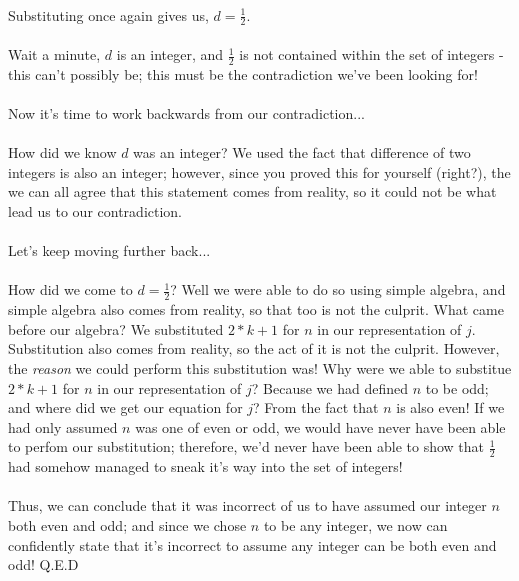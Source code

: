 \documentclass[a4paper,12pt]{article}
\begin{document}
\\ 
Substituting once again gives us, $d = \frac{1}{2}$.\\
\\
Wait a minute, $d$ is an integer, and $\frac{1}{2}$ is not contained within the set of integers - this can't possibly be; this must be the contradiction we've been looking for!\\
\\
Now it's time to work backwards from our contradiction...\\
\\
How did we know $d$ was an integer? We used the fact that difference of two integers is also an integer; however, since you proved this for yourself (right?), the we can all agree that this statement comes from reality, so it could not be what lead us to our contradiction.\\ 
\\
Let's keep moving further back...\\
\\
How did we come to $d = \frac{1}{2}$? Well we were able to do so using simple algebra, and simple algebra also comes from reality, so that too is not the culprit. What came before our algebra? We substituted $2*k + 1$ for $n$ in our representation of $j$. Substitution also comes from reality, so the act of it is not the culprit. However, the \textit{reason} we could perform this substitution was! Why were we able to substitue $2*k + 1$ for $n$ in our representation of $j$? Because we had defined $n$ to be odd; and where did we get our equation for $j$? From the fact that $n$ is also even! If we had only assumed $n$ was one of even or odd, we would have never have been able to perfom our substitution; therefore, we'd never have been able to show that $\frac{1}{2}$ had somehow managed to sneak it's way into the set of integers!\\
\\
Thus, we can conclude that it was incorrect of us to have assumed our integer $n$ both even and odd; and since we chose $n$ to be any integer, we now can confidently state that it's incorrect to assume any integer can be both even and odd! Q.E.D   
\end{document}
